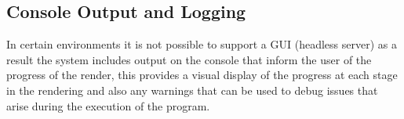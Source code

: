 \subsection{Console Output and Logging}
In certain environments it is not possible to support a GUI (headless server) as a result the system includes
output on the console that inform the user of the progress of the render, this provides a visual display of the
progress at each stage in the rendering and also any warnings that can be used to debug issues that arise
during the execution of the program.
